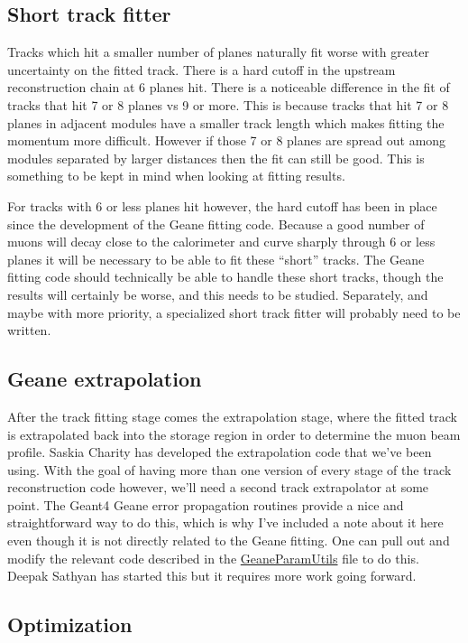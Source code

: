 	\subsection{Short track fitter}

		Tracks which hit a smaller number of planes naturally fit worse with greater uncertainty on the fitted track. There is a hard cutoff in the upstream reconstruction chain at 6 planes hit. There is a noticeable difference in the fit of tracks that hit 7 or 8 planes vs 9 or more. This is because tracks that hit 7 or 8 planes in adjacent modules have a smaller track length which makes fitting the momentum more difficult. However if those 7 or 8 planes are spread out among modules separated by larger distances then the fit can still be good. This is something to be kept in mind when looking at fitting results.

		For tracks with 6 or less planes hit however, the hard cutoff has been in place since the development of the Geane fitting code. Because a good number of muons will decay close to the calorimeter and curve sharply through 6 or less planes it will be necessary to be able to fit these ``short'' tracks. The Geane fitting code should technically be able to handle these short tracks, though the results will certainly be worse, and this needs to be studied. Separately, and maybe with more priority, a specialized short track fitter will probably need to be written.

	\subsection{Geane extrapolation}

		After the track fitting stage comes the extrapolation stage, where the fitted track is extrapolated back into the storage region in order to determine the muon beam profile. Saskia Charity has developed the extrapolation code that we've been using. With the goal of having more than one version of every stage of the track reconstruction code however, we'll need a second track extrapolator at some point. The Geant4 Geane error propagation routines provide a nice and straightforward way to do this, which is why I've included a note about it here even though it is not directly related to the Geane fitting. One can pull out and modify the relevant code described in the \hyperref[sec:GeaneParamUtils]{GeaneParamUtils} file to do this. Deepak Sathyan has started this but it requires more work going forward.

	\subsection{Optimization}


